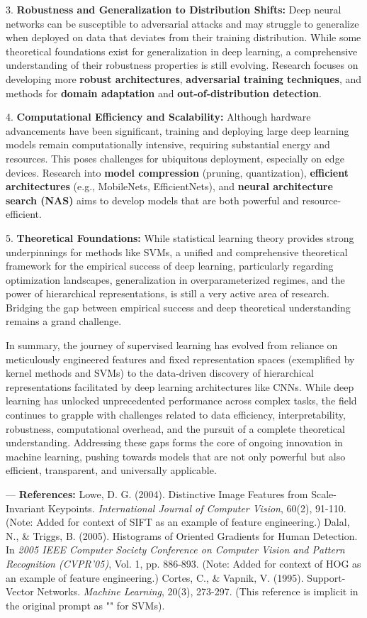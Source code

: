 \documentclass{article}
\begin{document}
3.  \textbf{Robustness and Generalization to Distribution Shifts:} Deep neural networks can be susceptible to adversarial attacks and may struggle to generalize when deployed on data that deviates from their training distribution. While some theoretical foundations exist for generalization in deep learning, a comprehensive understanding of their robustness properties is still evolving. Research focuses on developing more \textbf{robust architectures}, \textbf{adversarial training techniques}, and methods for \textbf{domain adaptation} and \textbf{out-of-distribution detection}.

4.  \textbf{Computational Efficiency and Scalability:} Although hardware advancements have been significant, training and deploying large deep learning models remain computationally intensive, requiring substantial energy and resources. This poses challenges for ubiquitous deployment, especially on edge devices. Research into \textbf{model compression} (pruning, quantization), \textbf{efficient architectures} (e.g., MobileNets, EfficientNets), and \textbf{neural architecture search (NAS)} aims to develop models that are both powerful and resource-efficient.

5.  \textbf{Theoretical Foundations:} While statistical learning theory provides strong underpinnings for methods like SVMs, a unified and comprehensive theoretical framework for the empirical success of deep learning, particularly regarding optimization landscapes, generalization in overparameterized regimes, and the power of hierarchical representations, is still a very active area of research. Bridging the gap between empirical success and deep theoretical understanding remains a grand challenge.

In summary, the journey of supervised learning has evolved from reliance on meticulously engineered features and fixed representation spaces (exemplified by kernel methods and SVMs) to the data-driven discovery of hierarchical representations facilitated by deep learning architectures like CNNs. While deep learning has unlocked unprecedented performance across complex tasks, the field continues to grapple with challenges related to data efficiency, interpretability, robustness, computational overhead, and the pursuit of a complete theoretical understanding. Addressing these gaps forms the core of ongoing innovation in machine learning, pushing towards models that are not only powerful but also efficient, transparent, and universally applicable.

---
\textbf{References:}
\cite{1} Lowe, D. G. (2004). Distinctive Image Features from Scale-Invariant Keypoints. \textit{International Journal of Computer Vision}, 60(2), 91-110. (Note: Added for context of SIFT as an example of feature engineering.)
\cite{2} Dalal, N., \& Triggs, B. (2005). Histograms of Oriented Gradients for Human Detection. In \textit{2005 IEEE Computer Society Conference on Computer Vision and Pattern Recognition (CVPR'05)}, Vol. 1, pp. 886-893. (Note: Added for context of HOG as an example of feature engineering.)
\cite{3} Cortes, C., \& Vapnik, V. (1995). Support-Vector Networks. \textit{Machine Learning}, 20(3), 273-297. (This reference is implicit in the original prompt as "\cite{3}" for SVMs).
\end{document}
